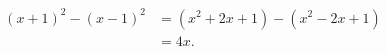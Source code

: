 \documentclass{article}
\begin{document}
\begin{align*}
  (x+1)^2-(x-1)^2
    &= (x^2+2x+1)-(x^2-2x+1) \\
    &= 4x.
\end{align*}
\end{document}
